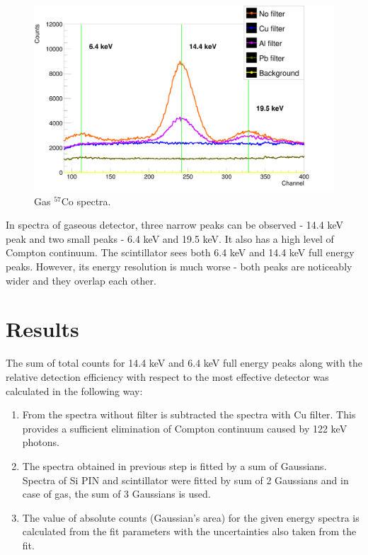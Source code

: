 \begin{figure}[H]
\centering
\includegraphics[scale=0.125, angle = 0]{./pictures/GasSpectre.png}
\caption{Gas $^{57}$Co spectra.}
\label{Gas detector spectra.}

\end{figure}


In spectra of gaseous detector, three narrow peaks can be observed - 14.4 keV peak and two small peaks - 6.4 keV and 19.5 keV. It also has a high level of Compton continuum.
The scintillator sees both 6.4 keV and 14.4 keV full energy peaks. However, its energy resolution is much worse - both peaks are noticeably wider and they overlap each other. 

\section{Results}
The sum of total counts for 14.4 keV and 6.4 keV full energy peaks along with the relative detection efficiency with respect to the most effective detector was calculated in the following way:

\begin{enumerate}
\item From the spectra without filter is subtracted the spectra with Cu filter. This provides a sufficient elimination of Compton continuum caused by 122 keV photons. 
\item The spectra obtained in previous step is fitted by a sum of Gaussians. Spectra of Si PIN and scintillator were fitted by sum of 2 Gaussians and in case of gas, the sum of 3 Gaussians is used.
\item The value of absolute counts (Gaussian's area) for the given energy spectra is calculated from the fit parameters with the uncertainties also taken from the fit.
\end{enumerate}




